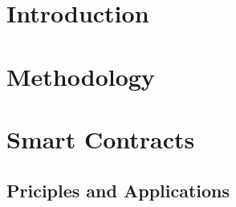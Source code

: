 \documentclass[conference]{IEEEtran}
\begin{document}




%
\IEEEpeerreviewmaketitle



\section{Introduction}



 

\section{Methodology}

\section{Smart Contracts}
\subsection{Priciples and Applications}
\end{document}
